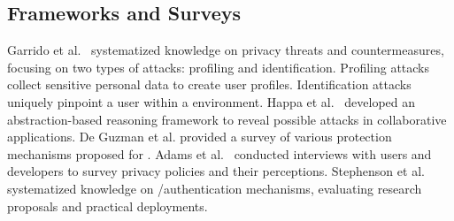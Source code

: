 \subsection{Frameworks and Surveys} %

Garrido et al.~\cite{garrido2023sok} systematized knowledge on \VR privacy threats and countermeasures, %
focusing on two types of attacks: profiling and identification.
Profiling attacks collect sensitive personal data to create user profiles.
Identification attacks uniquely pinpoint a user within a \VR environment. %
Happa et al.~\cite{10.3389/fict.2019.00005} developed an abstraction-based reasoning framework to reveal possible attacks in collaborative \MR applications.
De Guzman et al. \cite{De_Guzman_2019} provided a survey of various protection mechanisms proposed for \MR. 
Adams et al.~\cite{219386} conducted interviews with \MR users and developers to survey \MR privacy policies and their perceptions. %
Stephenson et al. \cite{stephenson2022sok} systematized knowledge on \AR/\VR authentication mechanisms, evaluating research proposals and practical deployments.


